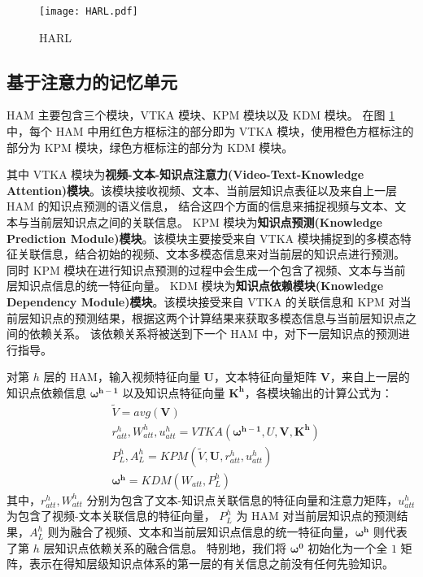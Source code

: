     \begin{figure}[t]
        \centering
        \texttt{[image: HARL.pdf]}
        \caption{HARL}
        \label{fig3.2}
    \end{figure}

\subsection{基于注意力的记忆单元}
    HAM 主要包含三个模块，VTKA 模块、KPM 模块以及 KDM 模块。
    在图 \ref{fig3.2} 中，每个 HAM 中用红色方框标注的部分即为 VTKA 模块，使用橙色方框标注的部分为 KPM 模块，绿色方框标注的部分为 KDM 模块。

    其中 VTKA 模块为\textbf{视频-文本-知识点注意力(Video-Text-Knowledge Attention)模块}。该模块接收视频、文本、当前层知识点表征以及来自上一层 HAM 的知识点预测的语义信息，
    结合这四个方面的信息来捕捉视频与文本、文本与当前层知识点之间的关联信息。
    KPM 模块为\textbf{知识点预测(Knowledge Prediction Module)模块}。该模块主要接受来自 VTKA 模块捕捉到的多模态特征关联信息，结合初始的视频、文本多模态信息来对当前层的知识点进行预测。
    同时 KPM 模块在进行知识点预测的过程中会生成一个包含了视频、文本与当前层知识点信息的统一特征向量。
    KDM 模块为\textbf{知识点依赖模块(Knowledge Dependency Module)模块}。该模块接受来自 VTKA 的关联信息和 KPM 对当前层知识点的预测结果，根据这两个计算结果来获取多模态信息与当前层知识点之间的依赖关系。
    该依赖关系将被送到下一个 HAM 中，对下一层知识点的预测进行指导。

    对第 $h$ 层的 HAM，输入视频特征向量 $\boldsymbol{U}$，文本特征向量矩阵 $\boldsymbol{V}$，来自上一层的知识点依赖信息 $\boldsymbol{\omega^{h - 1}}$ 以及知识点特征向量 $\boldsymbol{K^h}$，各模块输出的计算公式为：
    \begin{equation}
        \begin{aligned}
            &\tilde{V} = avg(\boldsymbol{V}) \\
            &r_{att}^h, W_{att}^h, u_{att}^h = VTKA(\boldsymbol{\omega^{h - 1}}, U, \boldsymbol{V}, \boldsymbol{K^h}) \\
            &P_L^h, A_L^h = KPM(\tilde{V}, \boldsymbol{U}, r_{att}^h, u_{att}^h) \\
            &\boldsymbol{\omega^h} = KDM(W_{att}, P_L^h)
        \end{aligned}
    \end{equation}
    其中，$r_{att}^{h}, W_{att}^h$ 分别为包含了文本-知识点关联信息的特征向量和注意力矩阵，$u_{att}^h$ 为包含了视频-文本关联信息的特征向量，
    $P_L^h$ 为 HAM 对当前层知识点的预测结果，$A_L^h$ 则为融合了视频、文本和当前层知识点信息的统一特征向量，$\boldsymbol{\omega^h}$ 则代表了第 $h$ 层知识点依赖关系的融合信息。
    特别地，我们将 $\boldsymbol{\omega^0}$ 初始化为一个全 $1$ 矩阵，表示在得知层级知识点体系的第一层的有关信息之前没有任何先验知识。

